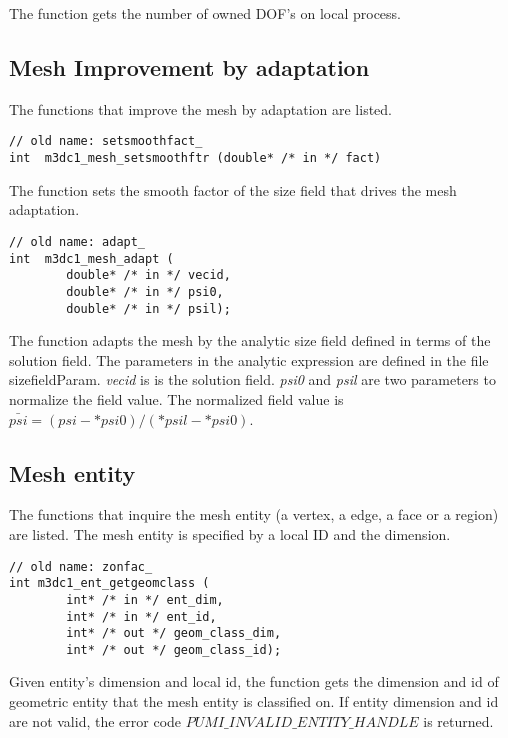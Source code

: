 The function gets the number of owned DOF's on local process. 

\subsection{Mesh Improvement by adaptation}
The functions that improve the mesh by adaptation are listed.
\begin{verbatim}
// old name: setsmoothfact_
int  m3dc1_mesh_setsmoothftr (double* /* in */ fact)
\end{verbatim}\vspace{-.5cm}\hspace{1cm}

The function sets the smooth factor of the size field that drives the mesh adaptation.

\begin{verbatim}
// old name: adapt_
int  m3dc1_mesh_adapt (
        double* /* in */ vecid, 
        double* /* in */ psi0,  
        double* /* in */ psil); 
\end{verbatim}\vspace{-.5cm}\hspace{1cm}

The function adapts the mesh by the analytic size field defined in terms of  the solution field. The parameters in the analytic expression are defined in the file sizefieldParam.
	      \textit{vecid} is is the solution field. 
	      \textit{psi0} and \textit{psil} are two parameters to normalize the field value. 
	      The normalized field value is $\bar{psi} = (psi - *psi0)/(*psil - *psi0)$.


\subsection{Mesh entity}
The functions that inquire the mesh entity (a vertex, a edge, a face or a region) are listed. The mesh entity is specified by a local ID and the dimension.
\begin{verbatim}
// old name: zonfac_
int m3dc1_ent_getgeomclass ( 
        int* /* in */ ent_dim, 
        int* /* in */ ent_id, 
        int* /* out */ geom_class_dim, 
        int* /* out */ geom_class_id); 
\end{verbatim}\vspace{-.5cm}\hspace{1cm}

Given entity's dimension and local id, the function gets the dimension and id of geometric entity that the mesh entity is classified on. If entity dimension and id are not valid, the error code $PUMI\_INVALID\_ENTITY\_HANDLE$ is returned.

